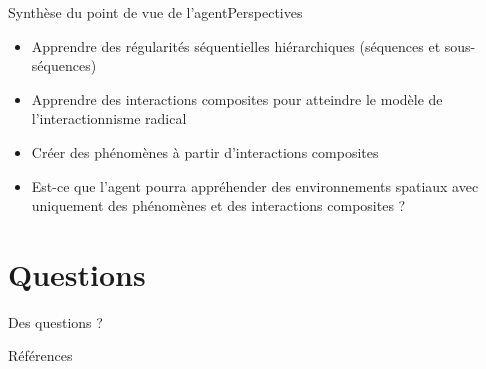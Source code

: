 \documentclass{beamer}
\begin{document}
\begin{frame}{Synthèse du point de vue de l'agent}{Perspectives}
\begin{itemize}
\item Apprendre des régularités séquentielles hiérarchiques (séquences et sous-séquences)
\item Apprendre des interactions composites pour atteindre le modèle de l'interactionnisme radical~\citep{Liris-6480-radical-interactionism}
\item Créer des phénomènes à partir d'interactions composites
\item Est-ce que l'agent pourra appréhender des environnements spatiaux avec uniquement des phénomènes et des interactions composites ?
\end{itemize}
\end{frame}

%	
\section{Questions}
\begin{frame}[plain]{Des questions ?}

\end{frame}

\backupbegin
\begin{frame}{Références}


\end{frame}
\backupend
\end{document}
